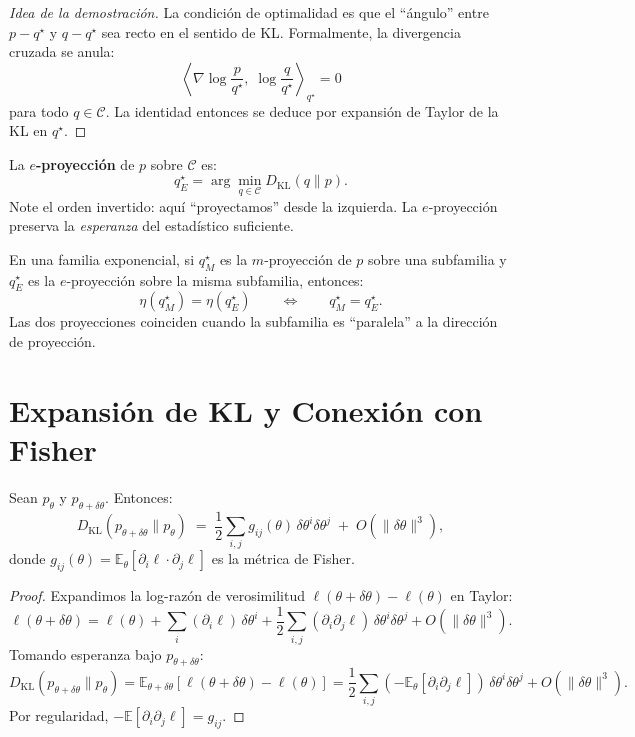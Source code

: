 \begin{proof}[Idea de la demostración]
	La condición de optimalidad es que el ``ángulo'' entre $p - q^\star$ y $q - q^\star$ sea recto en el sentido de KL.  Formalmente, la divergencia cruzada se anula:
	\[
	\left\langle \nabla \log \frac{p}{q^\star},\; \log \frac{q}{q^\star} \right\rangle_{q^\star} = 0
	\]
	para todo $q \in \mathcal{C}$.  La identidad entonces se deduce por expansión de Taylor de la KL en $q^\star$.
\end{proof}

\begin{definition}[$e$-proyección]
	La \textbf{$e$-proyección} de $p$ sobre $\mathcal{C}$ es:
	\[
	q^\star_E = \arg\min_{q \in \mathcal{C}} D_{\mathrm{KL}}(q \| p).
	\]
	Note el orden invertido: aquí ``proyectamos'' desde la izquierda.  La $e$-proyección preserva la \emph{esperanza} del estadístico suficiente.
\end{definition}

\begin{theorem}
	En una familia exponencial, si $q^\star_M$ es la $m$-proyección de $p$ sobre una subfamilia y $q^\star_E$ es la $e$-proyección sobre la misma subfamilia, entonces:
	\[
	\eta(q^\star_M) = \eta(q^\star_E) \qquad \Longleftrightarrow \qquad q^\star_M = q^\star_E.
	\]
	Las dos proyecciones coinciden cuando la subfamilia es ``paralela'' a la dirección de proyección.
\end{theorem}

\section{Expansión de KL y Conexión con Fisher}

\begin{theorem}
	Sean $p_\theta$ y $p_{\theta + \delta\theta}$.  Entonces:
	\[
	D_{\mathrm{KL}}(p_{\theta+\delta\theta} \| p_\theta) \;=\; \frac{1}{2} \sum_{i,j} g_{ij}(\theta)\, \delta\theta^i \delta\theta^j \;+\; O(\|\delta\theta\|^3),
	\]
	donde $g_{ij}(\theta) = \mathbb{E}_\theta[\partial_i \ell \cdot \partial_j \ell]$ es la métrica de Fisher.
\end{theorem}

\begin{proof}
	Expandimos la log-razón de verosimilitud $\ell(\theta + \delta\theta) - \ell(\theta)$ en Taylor:
	\[
	\ell(\theta + \delta\theta) = \ell(\theta) + \sum_i (\partial_i \ell)\,\delta\theta^i + \frac{1}{2}\sum_{i,j}(\partial_i \partial_j \ell)\,\delta\theta^i \delta\theta^j + O(\|\delta\theta\|^3).
	\]
	Tomando esperanza bajo $p_{\theta+\delta\theta}$:
	\[
	D_{\mathrm{KL}}(p_{\theta+\delta\theta} \| p_\theta) = \mathbb{E}_{\theta+\delta\theta}[\ell(\theta+\delta\theta) - \ell(\theta)] = \frac{1}{2}\sum_{i,j}(-\mathbb{E}_{\theta}[\partial_i\partial_j\ell])\,\delta\theta^i\delta\theta^j + O(\|\delta\theta\|^3).
	\]
	Por regularidad, $-\mathbb{E}[\partial_i\partial_j\ell] = g_{ij}$.
\end{proof}

